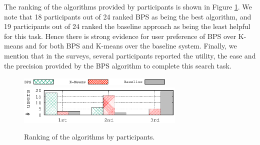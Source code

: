 The ranking of the algorithms provided by participants is shown in Figure \ref{fig:UserSurveyRanking}. 
We note that 18 participants out of 24 ranked  BPS as being the best algorithm, and 19 participants out of 24 ranked the baseline approach as being the least helpful for this task.  Hence there is strong evidence for user preference of BPS over K-means and for both BPS and K-means over the baseline system.  
Finally, we mention that in the surveys, several participants reported the utility, the ease and the precision provided by the BPS algorithm to complete this search task.














\begin{figure}[t]
\begin{centering}
\includegraphics[width=7.5cm]{imgs/legend4}\\
{\includegraphics[width=8cm]{imgs/ranking}}
\par\end{centering}
\caption{Ranking of the algorithms by participants.}
\label{fig:UserSurveyRanking}
\end{figure}







